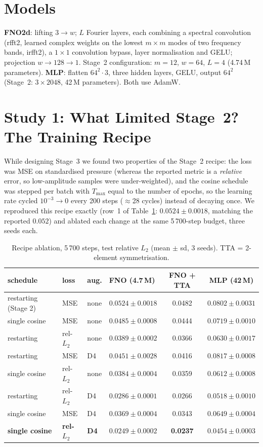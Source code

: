\documentclass[11pt,a4paper]{article}
\begin{document}
\section{Models}
\textbf{FNO2d}: lifting $3\to w$; $L$ Fourier layers, each combining a spectral convolution (rfft2, learned complex weights on the lowest $m\times m$ modes of two frequency bands, irfft2), a $1\times1$ convolution bypass, layer normalisation and GELU; projection $w\to128\to1$. Stage~2 configuration: $m=12$, $w=64$, $L=4$ (4.74\,M parameters). \textbf{MLP}: flatten $64^2\!\cdot\!3$, three hidden layers, GELU, output $64^2$ (Stage~2: $3\times2048$, 42\,M parameters). Both use AdamW.

\section{Study 1: What Limited Stage~2? The Training Recipe}\label{sec:recipe}
While designing Stage~3 we found two properties of the Stage~2 recipe: the loss was MSE on standardised pressure (whereas the reported metric is a \emph{relative} error, so low-amplitude samples were under-weighted), and the cosine schedule was stepped per batch with $T_{\max}$ equal to the number of epochs, so the learning rate cycled $10^{-3}\to0$ every 200 steps ($\approx$28 cycles) instead of decaying once. We reproduced this recipe exactly (row~1 of Table~\ref{tab:recipe}: $0.0524\pm0.0018$, matching the reported $0.052$) and ablated each change at the same 5\,700-step budget, three seeds each.

\begin{table}[H]\centering\small
\caption{Recipe ablation, 5\,700 steps, test relative $L_2$ (mean $\pm$ sd, 3 seeds). TTA = 2-element symmetrisation.}\label{tab:recipe}
\begin{tabular}{llllcc}\toprule
schedule & loss & aug. & FNO (4.7\,M) & FNO + TTA & MLP (42\,M)\\\midrule
restarting (Stage 2) & MSE & none & $0.0524\pm0.0018$ & 0.0482 & $0.0802\pm0.0031$\\
single cosine & MSE & none & $0.0485\pm0.0008$ & 0.0444 & $0.0719\pm0.0010$\\
restarting & rel-$L_2$ & none & $0.0389\pm0.0002$ & 0.0366 & $0.0630\pm0.0017$\\
restarting & MSE & D4 & $0.0451\pm0.0028$ & 0.0416 & $0.0817\pm0.0008$\\
single cosine & rel-$L_2$ & none & $0.0384\pm0.0004$ & 0.0359 & $0.0612\pm0.0008$\\
restarting & rel-$L_2$ & D4 & $0.0286\pm0.0001$ & 0.0266 & $0.0518\pm0.0010$\\
single cosine & MSE & D4 & $0.0369\pm0.0004$ & 0.0343 & $0.0649\pm0.0004$\\
\textbf{single cosine} & \textbf{rel-$L_2$} & \textbf{D4} & $\mathbf{0.0249\pm0.0002}$ & \textbf{0.0237} & $\mathbf{0.0454\pm0.0003}$\\\bottomrule
\end{tabular}\end{table}
\end{document}
